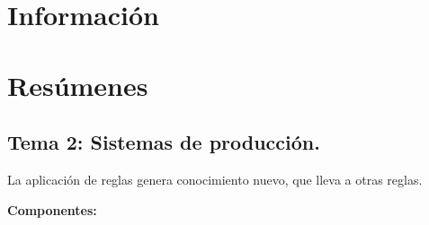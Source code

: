 \documentclass[12pt, twoside, openright]{report} %
\begin{document}





\part{Información}



\part{Resúmenes}
\chapter{Tema 2: Sistemas de producción.}


  La aplicación de reglas genera conocimiento nuevo, que lleva a otras
  reglas.

 
  \textbf{Componentes:}
  
\end{document}
